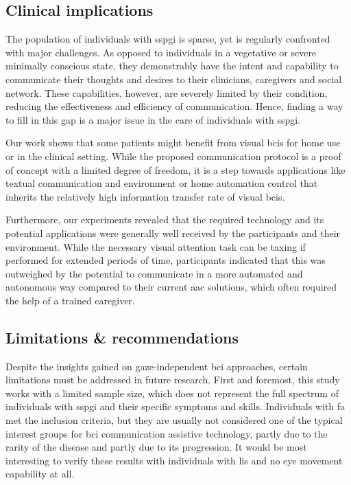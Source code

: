 \documentclass{article}
\begin{document}
\subsection{Clinical implications}
The population of individuals with \ac{sspgi} is sparse, yet is regularly
confronted with major challenges.
As opposed to individuals in a vegetative or severe minimally conscious state,
they demonstrably have the intent and capability to communicate their thoughts
and desires to their clinicians, caregivers and social network.
These capabilities, however, are severely limited by their condition,
reducing the effectiveness and efficiency of communication.
Hence, finding a way to fill in this gap is a major issue in the care of
individuals with \ac{sspgi}.

Our work shows that some patients might benefit from visual \acp{bci}
for home use or in the clinical setting.
While the proposed communication protocol is a proof of concept with a limited degree
of freedom, it is a step towards applications like textual communication and
environment or home automation control that inherits the relatively high
information transfer rate of visual \acp{bci}.

Furthermore, our experiments revealed that the required technology and its
potential applications were generally well received by the participants and their
environment.
While the necessary visual attention task can be taxing if performed for
extended
periods of time, participants indicated that this was outweighed by the
potential to communicate in a more automated and autonomous way compared to
their current \ac{aac} solutions, which often required the help of a trained caregiver.

\subsection{Limitations \& recommendations}

Despite the insights gained on gaze-independent \ac{bci} approaches, certain limitations must be addressed in future research.
First and foremost, this study works with a limited sample size, which
does not represent the full spectrum of individuals with
\ac{sspgi} and their specific symptoms and skills.
Individuals with \ac{fa} met the inclusion criteria, but they are usually not
considered one of the typical interest groups for \ac{bci} communication assistive
technology, partly due to the rarity of the disease and partly due to its
progression.
It would be most interesting to verify these results with individuals with
\ac{lis} and no eye movement capability at all.
\end{document}
